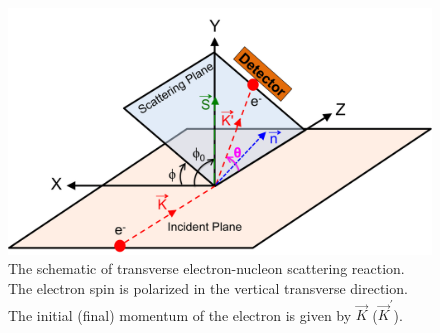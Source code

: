 %


\begin{singlespace}
\begin{figure}[!h]
	\begin{center}
	\includegraphics[width=15.0cm]{figures/transverse_diagram}
	\end{center}
	\caption
	{The schematic of transverse electron-nucleon scattering reaction. The electron spin is polarized in the vertical transverse direction. The initial (final) momentum of the electron is given by $\vec{K}$ ($\vec{K}^{\prime}$).}
	\label{fig:transverse_diagram}
\end{figure}
\end{singlespace}

